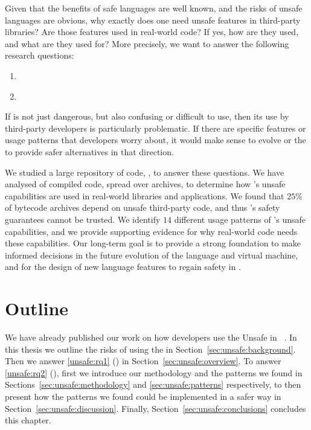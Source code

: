 Given that the benefits of safe languages are well known,
and the risks of unsafe languages are obvious,
why exactly does one need unsafe features in third-party libraries?
Are those features used in real-world code?
If yes, how are they used, and what are they used for?
More precisely, we want to answer the following research questions:

\begin{enumerate}[label=$RQ/U\arabic*:$,ref=$RQ/U\arabic*$,leftmargin=3.4\parindent]
\item\label{unsafe:rq1} {\bf \urqA} \urqAdesc{}
\item\label{unsafe:rq2} {\bf \urqB} \urqBdesc{}
\end{enumerate}

If \unsafe{} is not just dangerous,
but also confusing or difficult to use,
then its use by third-party developers is particularly problematic.
If there are specific \unsafe{} features or usage patterns that developers worry about,
it would make sense to evolve \java{} or the \jvm{} to provide safer alternatives in that direction.

We studied a large repository of \java{} code, \mavencentral{},
to answer these questions.
We have analysed \statreposize{} of compiled \java{} code,
spread over \statrepouniquearts{} \java{} archives,
to determine how \java{}'s unsafe capabilities are used in real-world
libraries and applications.
We found that $25\%$ of \java{} bytecode archives depend on unsafe
third-party \java{} code, and thus \java{}'s safety
guarantees cannot be trusted.
We identify $14$ different usage patterns of \java{}'s unsafe capabilities,
and we provide supporting evidence for why real-world code needs these capabilities.
Our long-term goal is to provide a strong foundation
to make informed decisions in the future evolution of the \java{} language and virtual machine,
and for the design of new language features to regain safety in \java{}.

\section*{Outline}

We have already published our work on how developers use the Unsafe \api{} in \java{}~\citep{mastrangeloUseYourOwn2015}.
In this thesis we outline the risks of using the \unsafe{} \api{} in Section~\ref{sec:unsafe:background}.
Then we answer \ref{unsafe:rq1} (\urqA{}) in Section~\ref{sec:unsafe:overview}.
To answer \ref{unsafe:rq2} (\urqB{}),
first we introduce our methodology and the patterns we found in Sections~\ref{sec:unsafe:methodology} and \ref{sec:unsafe:patterns} respectively,
to then present how the patterns we found could be implemented in a safer way in Section~\ref{sec:unsafe:discussion}.
Finally, Section~\ref{sec:unsafe:conclusions} concludes this chapter.







